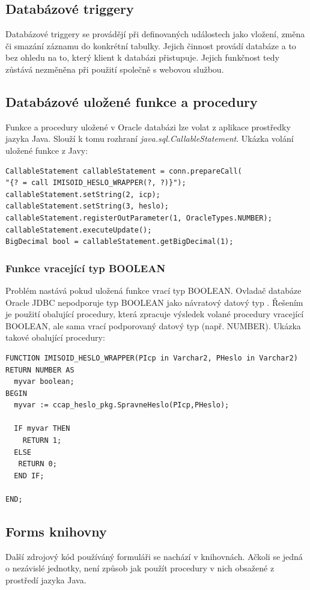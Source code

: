 \documentclass{diplomka}
\begin{document}
\subsection{Databázové triggery}
Databázové triggery se provádějí při definovaných událostech jako vložení, změna či smazání záznamu do konkrétní tabulky. Jejich činnost provádí databáze a to bez ohledu na to, který klient k databázi přistupuje. Jejich funkčnost tedy zůstává nezměněna při použití společně s webovou službou.

\subsection{Databázové uložené funkce a  procedury}
Funkce a procedury uložené v Oracle databázi lze volat z aplikace prostředky jazyka Java. Slouží k tomu rozhraní \emph{java.sql.CallableStatement}. Ukázka volání uložené funkce z Javy:\\

\begin{lstlisting}
CallableStatement callableStatement = conn.prepareCall(
"{? = call IMISOID_HESLO_WRAPPER(?, ?)}");
callableStatement.setString(2, icp);
callableStatement.setString(3, heslo);
callableStatement.registerOutParameter(1, OracleTypes.NUMBER);
callableStatement.executeUpdate();
BigDecimal bool = callableStatement.getBigDecimal(1);
\end{lstlisting}

\subsubsection{Funkce vracející typ BOOLEAN}
Problém nastává pokud uložená funkce vrací typ BOOLEAN. Ovladač databáze Oracle JDBC nepodporuje typ BOOLEAN jako návratový datový typ \cite{limitation}. Řešením je použití obalující procedury, která zpracuje výsledek volané procedury vracející BOOLEAN, ale sama vrací podporovaný datový typ (např. NUMBER). Ukázka takové obalující procedury: \\

\begin{lstlisting}
FUNCTION IMISOID_HESLO_WRAPPER(PIcp in Varchar2, PHeslo in Varchar2) RETURN NUMBER AS
  myvar boolean;
BEGIN
  myvar := ccap_heslo_pkg.SpravneHeslo(PIcp,PHeslo);
  
  IF myvar THEN
    RETURN 1;
  ELSE
   RETURN 0;
  END IF;  
 
END;
\end{lstlisting}

\subsection{Forms knihovny}
Další zdrojový kód používáný formuláři se nachází v knihovnách. Ačkoli se jedná o nezávislé jednotky, není způsob jak použít procedury v nich obsažené z prostředí jazyka Java.
\end{document}

